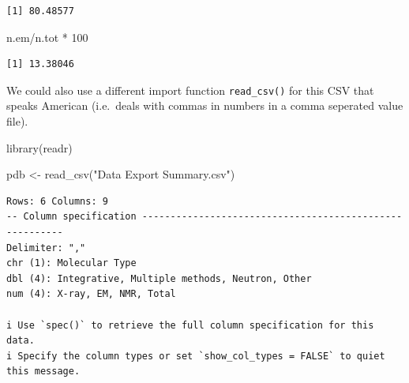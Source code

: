 \documentclass[
  letterpaper,
  DIV=11,
  numbers=noendperiod]{scrartcl}
\newenvironment{Shaded}{\begin{snugshade}}{\end{snugshade}}
\newcommand{\AttributeTok}[1]{\textcolor[rgb]{0.40,0.45,0.13}{#1}}
\newcommand{\DecValTok}[1]{\textcolor[rgb]{0.68,0.00,0.00}{#1}}
\newcommand{\FunctionTok}[1]{\textcolor[rgb]{0.28,0.35,0.67}{#1}}
\newcommand{\NormalTok}[1]{\textcolor[rgb]{0.00,0.23,0.31}{#1}}
\newcommand{\OtherTok}[1]{\textcolor[rgb]{0.00,0.23,0.31}{#1}}
\newcommand{\SpecialCharTok}[1]{\textcolor[rgb]{0.37,0.37,0.37}{#1}}
\newcommand{\StringTok}[1]{\textcolor[rgb]{0.13,0.47,0.30}{#1}}
\begin{document}
\begin{verbatim}
[1] 80.48577
\end{verbatim}

\begin{Shaded}
\begin{Highlighting}[]
\NormalTok{n.em}\SpecialCharTok{/}\NormalTok{n.tot }\SpecialCharTok{*} \DecValTok{100}
\end{Highlighting}
\end{Shaded}

\begin{verbatim}
[1] 13.38046
\end{verbatim}

We could also use a different import function \texttt{read\_csv()} for
this CSV that speaks American (i.e.~deals with commas in numbers in a
comma seperated value file).

\begin{Shaded}
\begin{Highlighting}[]
\FunctionTok{library}\NormalTok{(readr)}

\NormalTok{pdb }\OtherTok{\textless{}{-}} \FunctionTok{read\_csv}\NormalTok{(}\StringTok{"Data Export Summary.csv"}\NormalTok{)}
\end{Highlighting}
\end{Shaded}

\begin{verbatim}
Rows: 6 Columns: 9
-- Column specification --------------------------------------------------------
Delimiter: ","
chr (1): Molecular Type
dbl (4): Integrative, Multiple methods, Neutron, Other
num (4): X-ray, EM, NMR, Total

i Use `spec()` to retrieve the full column specification for this data.
i Specify the column types or set `show_col_types = FALSE` to quiet this message.
\end{verbatim}

\begin{Shaded}
\end{Shaded}
\end{document}
